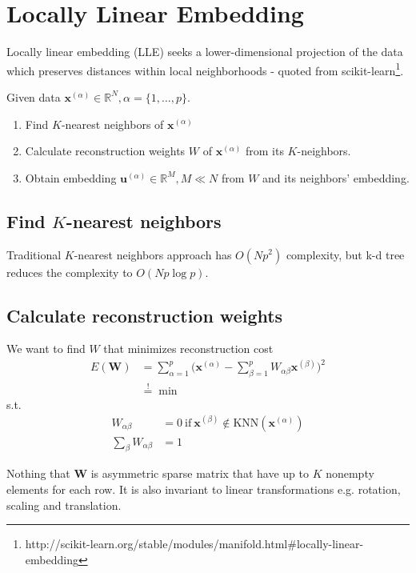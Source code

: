 \section{Locally Linear Embedding}

Locally linear embedding (LLE) seeks a lower-dimensional projection of the data which preserves distances within local neighborhoods - quoted from scikit-learn\footnote{http://scikit-learn.org/stable/modules/manifold.html\#locally-linear-embedding}.

Given data $\boldsymbol{x}^{(\alpha)}  \in \mathbb{R}^N, \alpha = \{1, \dots, p \}$.
\begin{enumerate}
	\item Find $K$-nearest neighbors of $\boldsymbol{x}^{(\alpha)}$
	\item Calculate reconstruction weights $W$ of $\boldsymbol{x}^{(\alpha)}$ from its $K$-neighbors.
	\item Obtain embedding $\boldsymbol{u}^{(\alpha)} \in \mathbb{R}^M, M \ll N$ from $W$ and its neighbors' embedding.
\end{enumerate}

\subsection{Find $K$-nearest neighbors}
Traditional $K$-nearest neighbors approach has $O(Np^2)$ complexity, but k-d tree reduces the complexity to $O(Np \log p)$.
\subsection{Calculate  reconstruction weights}
We want to find $W$ that minimizes reconstruction cost 
\begin{align*}
E(\boldsymbol{W}) &= \sum_{\alpha=1}^{p}  \bigg ( \boldsymbol{x}^{(\alpha)} - \sum_{\beta = 1 }^p W_{\alpha \beta } \boldsymbol{x}^{(\beta)} \bigg )^2	\\
&\stackrel{!}{=} \min 
\end{align*}
s.t. 
\begin{align*}
	W_{\alpha\beta} &= 0 \ \text{if} \ \boldsymbol{x}^{(\beta)} \not\in \text{KNN}(\boldsymbol{x}^{(\alpha)}) \\
	\sum_{\beta} W_{\alpha\beta} &= 1
\end{align*}

Nothing that $\boldsymbol{W}$ is asymmetric sparse matrix that have up to $K$ nonempty elements for each row. It is also invariant to linear transformations e.g. rotation, scaling and translation.

